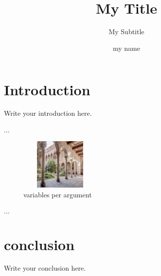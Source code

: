 \documentclass{article}
\title{My Title}
\subtitle{My Subtitle}
\author{my name}
\begin{document}
\maketitle























\section* {Introduction}


Write your introduction here.


 
 

...

\begin{figure}[H]
    \centering
    \includegraphics[width=4cm, height=2.5cm]{images/edifici-historic-universitat-de-barcelona.jpg}
    \caption{variables per argument}
    \label{taula}
\end{figure}%



...


\section* {conclusion}

Write your conclusion here.












\end{document}

